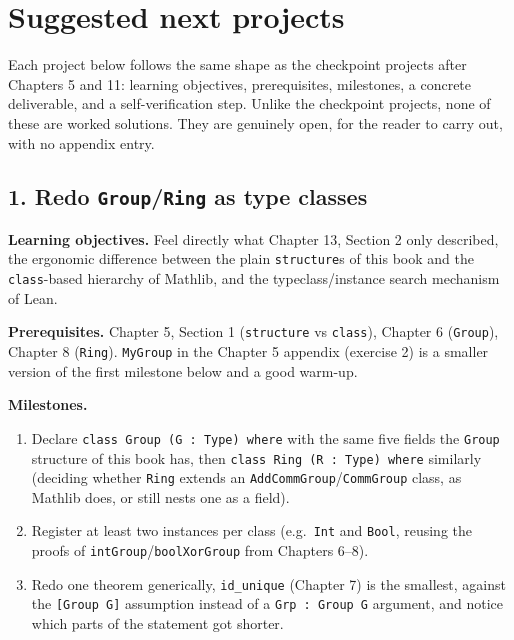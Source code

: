 \section{Suggested next projects}\label{sec:13-next-steps:03-next-projects:1}

Each project below follows the same shape as the checkpoint projects after Chapters 5 and 11: learning objectives, prerequisites, milestones, a concrete deliverable, and a self-verification step. Unlike the checkpoint projects, none of these are worked solutions. They are genuinely open, for the reader to carry out, with no appendix entry.

\subsection{\texorpdfstring{1. Redo \texttt{Group}/\texttt{Ring} as type classes}{1. Redo Group/Ring as type classes}}\label{sec:13-next-steps:03-next-projects:2}

\textbf{Learning objectives.} Feel directly what Chapter 13, Section 2 only described, the ergonomic difference between the plain \texttt{structure}s of this book and the \texttt{class}-based hierarchy of Mathlib, and the typeclass/instance search mechanism of Lean.

\textbf{Prerequisites.} Chapter 5, Section 1 (\texttt{structure} vs \texttt{class}), Chapter 6 (\texttt{Group}), Chapter 8 (\texttt{Ring}). \texttt{MyGroup} in the Chapter 5 appendix (exercise 2) is a smaller version of the first milestone below and a good warm-up.

\textbf{Milestones.}

\begin{enumerate}
\def\labelenumi{\arabic{enumi}.}
\tightlist
\item
  Declare \texttt{class Group (G : Type) where} with the same five fields the \texttt{Group} structure of this book has, then \texttt{class Ring (R : Type) where} similarly (deciding whether \texttt{Ring} extends an \texttt{AddCommGroup}/\texttt{CommGroup} class, as Mathlib does, or still nests one as a field).
\item
  Register at least two instances per class (e.g.~\texttt{Int} and \texttt{Bool}, reusing the proofs of \texttt{intGroup}/\texttt{boolXorGroup} from Chapters 6--8).
\item
  Redo one theorem generically, \texttt{id\_\allowbreak{}unique} (Chapter 7) is the smallest, against the \texttt{[Group G]} assumption instead of a \texttt{Grp : Group G} argument, and notice which parts of the statement got shorter.
\end{enumerate}

